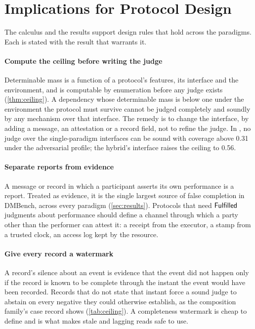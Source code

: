 \section{Implications for Protocol Design}
\label{sec:implications}

The calculus and the results support design rules that hold across the paradigms. Each is stated with the result that warrants it.

\paragraph{Compute the ceiling before writing the judge} Determinable mass is a function of a protocol's features, its interface and the environment, and is computable by enumeration before any judge exists (\cref{thm:ceiling}). A dependency whose determinable mass is below one under the environment the protocol must survive cannot be judged completely and soundly by any mechanism over that interface. The remedy is to change the interface, by adding a message, an attestation or a record field, not to refine the judge. In , no judge over the single-paradigm interfaces can be sound with coverage above 0.31 under the adversarial profile; the hybrid's interface raises the ceiling to 0.56.

\paragraph{Separate reports from evidence} A message or record in which a participant asserts its own performance is a report. Treated as evidence, it is the single largest source of false completion in DMBench, across every paradigm (\cref{sec:results}). Protocols that need $\mathsf{Fulfilled}$ judgments about performance should define a channel through which a party other than the performer can attest it: a receipt from the executor, a stamp from a trusted clock, an access log kept by the resource.

\paragraph{Give every record a watermark} A record's silence about an event is evidence that the event did not happen only if the record is known to be complete through the instant the event would have been recorded. Records that do not state that instant force a sound judge to abstain on every negative they could otherwise establish, as the composition family's case record shows (\cref{tab:ceiling}). A completeness watermark is cheap to define and is what makes stale and lagging reads safe to use.

